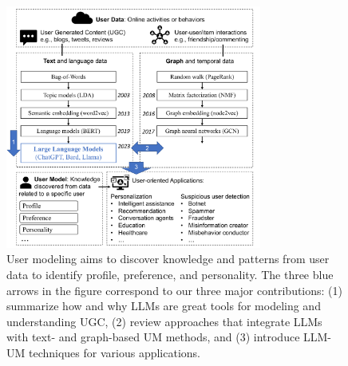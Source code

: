 \documentclass[11pt]{article}
\begin{document}
\begin{figure}[h]
  \centering
  \includegraphics[width=0.75\textwidth]{submissions/Meng2023/figs/intro.pdf}
  \caption{User modeling aims to discover knowledge and patterns from user data to identify profile, preference, and personality. The three blue arrows in the figure correspond to our three major contributions: (1) summarize how and why LLMs are great tools for modeling and understanding UGC, (2) review approaches that integrate LLMs with text- and graph-based UM methods, and (3) introduce LLM-UM techniques for various applications.}
  \label{fig:intro}
\end{figure}

\end{document}
